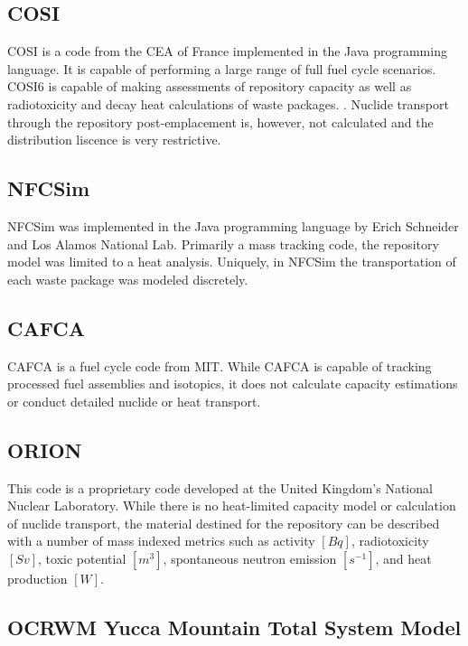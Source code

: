 \subsection{COSI}

\gls{COSI} is a code from the CEA of France implemented in the Java programming 
language. It is capable of performing a large range of full fuel cycle 
scenarios. COSI6 is capable of making assessments of repository capacity as 
well as radiotoxicity and decay heat calculations of waste packages. 
\cite{boucher_international_2010}. Nuclide transport through the repository 
post-emplacement is, however, not calculated and the distribution liscence is 
very restrictive.


\subsection{NFCSim}

\gls{NFCSim} was implemented in the Java programming language by Erich Schneider 
and Los Alamos National Lab. Primarily a mass tracking code, the repository 
model was limited to a heat analysis. Uniquely, in NFCSim the transportation of 
each waste package was modeled discretely. \cite{schneider_nfcsim_2004}

\subsection{CAFCA}

\gls{CAFCA} is a fuel cycle code from MIT. While \gls{CAFCA} is capable of 
tracking processed fuel assemblies and isotopics, it does not calculate 
capacity estimations or conduct detailed nuclide or heat transport.  

\subsection{ORION} 

This code is a proprietary code developed at the United
Kingdom's National Nuclear Laboratory. While there is no heat-limited capacity 
model or calculation of nuclide transport, the material destined for the 
repository can be described with a number of mass indexed metrics such as activity 
$[Bq]$, radiotoxicity $[Sv]$,  toxic potential $[m^3]$, spontaneous neutron emission 
$[s^{-1}]$, and heat production $[W]$.



\subsection{OCRWM Yucca Mountain Total System Model}

